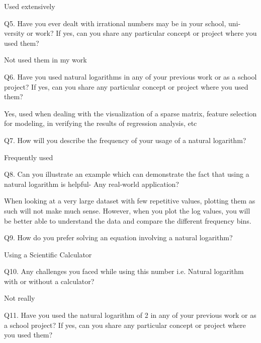 \documentclass[12pt]{article}
\begin{document}
Used extensively\par


\vspace{\baselineskip}
Q5. Have you ever dealt with irrational numbers may be in your school, uni- versity or work? If yes, can you share any particular concept or project where you used them?\par

Not used them in my work\par


\vspace{\baselineskip}
Q6. Have you used natural logarithms in any of your previous work or as a school project? If yes, can you share any particular concept or project where you used them?\par

Yes, used when dealing with the visualization of a sparse matrix, feature selection for modeling, in verifying the results of regression analysis, etc\par


\vspace{\baselineskip}
Q7. How will you describe the frequency of your usage of a natural logarithm?\par

Frequently used\par


\vspace{\baselineskip}
Q8. Can you illustrate an example which can demonstrate the fact that using a natural logarithm is helpful- Any real-world application?\par

When looking at a very large dataset with few repetitive values, plotting them as such will not make much sense. However, when you plot the log values, you will be better able to understand the data and compare the different frequency bins.\par

Q9. How do you prefer solving an equation involving a natural logarithm?\par

Using a Scientific Calculator \par

Q10. Any challenges you faced while using this number i.e. Natural logarithm with or without a calculator?\par

Not really\par


\vspace{\baselineskip}
Q11. Have you used the natural logarithm of 2 in any of your previous work or as a school project? If yes, can you share any particular concept or project where you used them?\par
\end{document}
